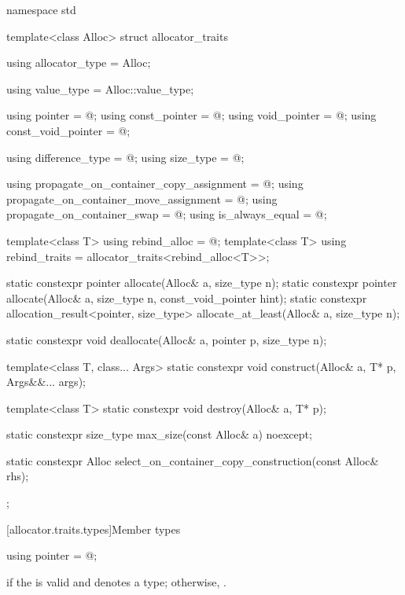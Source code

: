%
\begin{codeblock}
namespace std {
  template<class Alloc> struct allocator_traits {
    using allocator_type     = Alloc;

    using value_type         = Alloc::value_type;

    using pointer            = @\seebelow@;
    using const_pointer      = @\seebelow@;
    using void_pointer       = @\seebelow@;
    using const_void_pointer = @\seebelow@;

    using difference_type    = @\seebelow@;
    using size_type          = @\seebelow@;

    using propagate_on_container_copy_assignment = @\seebelow@;
    using propagate_on_container_move_assignment = @\seebelow@;
    using propagate_on_container_swap            = @\seebelow@;
    using is_always_equal                        = @\seebelow@;

    template<class T> using rebind_alloc = @\seebelow@;
    template<class T> using rebind_traits = allocator_traits<rebind_alloc<T>>;

    static constexpr pointer allocate(Alloc& a, size_type n);
    static constexpr pointer allocate(Alloc& a, size_type n, const_void_pointer hint);
    static constexpr allocation_result<pointer, size_type>
      allocate_at_least(Alloc& a, size_type n);

    static constexpr void deallocate(Alloc& a, pointer p, size_type n);

    template<class T, class... Args>
      static constexpr void construct(Alloc& a, T* p, Args&&... args);

    template<class T>
      static constexpr void destroy(Alloc& a, T* p);

    static constexpr size_type max_size(const Alloc& a) noexcept;

    static constexpr Alloc select_on_container_copy_construction(const Alloc& rhs);
  };
}
\end{codeblock}

[allocator.traits.types]{Member types}

%
\begin{itemdecl}
using pointer = @\seebelow@;
\end{itemdecl}

\begin{itemdescr}
\pnum
\ctype {} if
the   is valid and denotes a
type; otherwise, .
\end{itemdescr}

